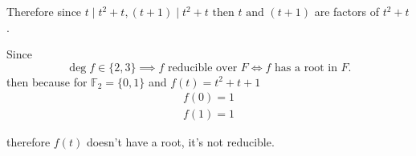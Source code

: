 \documentclass[12pt]{article}
\begin{document}
\begin{enumerate}
        Therefore since $t \mid t^2 + t, (t + 1) \mid t^2 + t \text{ then } t \text{ and } (t + 1)$ are factors of $t^2 + t$.

        Since
        \[
        \deg f\in\{2,3\} \implies f\text{ reducible over }F \iff f\text{ has a root in }F.
        \]
        then because for $\mathbb{F}_2=\{0, 1\}$ and $f(t) = t^2 + t + 1$
        \[
        \begin{gathered}
          f(0) = 1 \\
          f(1) = 1
        \end{gathered}
        \]

        therefore $f(t)$ doesn't have a root, it's not reducible.
\end{enumerate}
\end{document}
